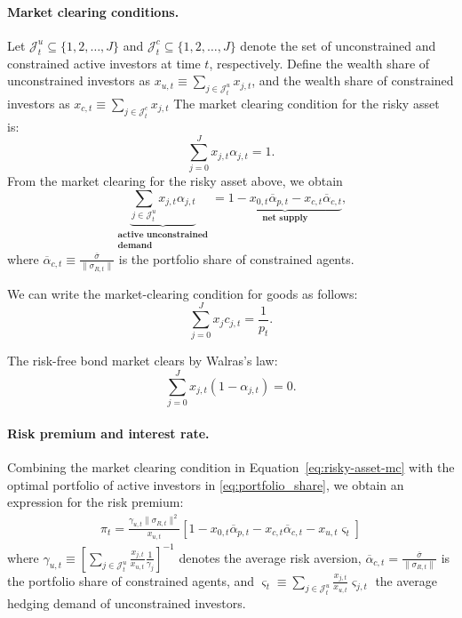 \paragraph{Market clearing conditions.} 
Let $\mathcal{J}_t^u \subseteq \{1,2,\ldots, J\}$ and $\mathcal{J}_t^c \subseteq \{1,2,\ldots, J\}$ denote the set of unconstrained and constrained active investors at time $t$, respectively.
Define the wealth share of unconstrained investors as $x_{u,t} \equiv \sum_{j\in \mathcal{J}_t^u} x_{j,t}$, and the wealth share of constrained investors as  $x_{c,t} \equiv \sum_{j\in \mathcal{J}_t^c} x_{j,t}$
The market clearing condition for the risky asset is:
\begin{equation}\label{eq:risky-asset-mc2}
	\sum_{j=0}^Jx_{j,t}\alpha_{j,t}=1.
\end{equation}
From the market clearing for the risky asset above, we obtain
\begin{equation}\label{eq:risky-asset-mc}
	\underbrace{\sum_{j \in \mathcal{J}_t^u} x_{j,t} \alpha_{j,t} }_{\substack{\textbf{active unconstrained}\\
			\textbf{demand}}} = \underbrace{1 - x_{0,t} \overline{\alpha}_{p,t} - x_{c,t} \overline{\alpha}_{c,t} }_{\textbf{net supply}},
\end{equation}
where $\overline{\alpha}_{c,t} \equiv\frac{\overline{\sigma}}{\|\sigma_{R,t}\|}$ is the portfolio share of constrained agents. 

We can write the market-clearing condition for goods as follows:
\begin{equation}\label{eq:goods-mc}
	\sum_{j=0}^J x_j c_{j,t} = \frac{1}{p_t}.
\end{equation}

The risk-free bond market clears by Walras's law:
\begin{equation}\label{eq:risk-free-mc}
	\sum_{j=0}^Jx_{j,t}(1-\alpha_{j,t})=0.
\end{equation}

\paragraph{Risk premium and interest rate.} 


Combining the market clearing condition in Equation~\eqref{eq:risky-asset-mc} with the optimal portfolio of active investors in \eqref{eq:portfolio_share}, we obtain an expression for the risk premium:
\begin{align} \label{eq:sharpe_ratio}
	\pi_{t} =  \frac{\gamma_{u,t} \|\sigma_{R,t}\|^2}{x_{u,t}} \left[ 1 - x_{0,t} \overline{\alpha}_{p,t} - x_{c,t} \overline{\alpha}_{c,t} - x_{u,t} \varsigma_{t} \right]
\end{align}
where $\gamma_{u,t} \equiv \left[ \sum_{j\in\mathcal{J}_t^u} \frac{x_{j,t}}{x_{u,t}} \frac{1}{\gamma_j}\right]^{-1}$ denotes the average risk aversion, $ \overline{\alpha}_{c,t}=\frac{\overline{\sigma}}{\|\sigma_{R,t}\|} $ is the portfolio share of constrained agents, and $\varsigma_t \equiv \sum_{j\in \mathcal{J}_t^u} \frac{x_{j,t}}{x_{u,t}} \varsigma_{j,t} $ the average hedging demand of unconstrained investors.


